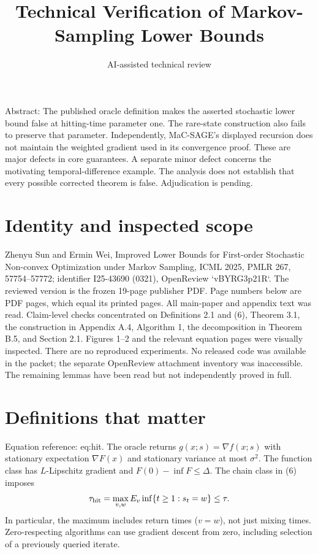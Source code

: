 \documentclass[10pt]{article}
\title{Technical Verification of Markov-Sampling Lower Bounds}
\author{AI-assisted technical review}
\date{}
\begin{document}
\maketitle
Abstract: The published oracle definition makes the asserted stochastic lower bound false at hitting-time parameter one. The rare-state construction also fails to preserve that parameter. Independently, MaC-SAGE’s displayed recursion does not maintain the weighted gradient used in its convergence proof. These are major defects in core guarantees. A separate minor defect concerns the motivating temporal-difference example. The analysis does not establish that every possible corrected theorem is false. Adjudication is pending.\par
\section*{Identity and inspected scope}
Zhenyu Sun and Ermin Wei, Improved Lower Bounds for First-order Stochastic Non-convex Optimization under Markov Sampling, ICML 2025, PMLR 267, 57754–57772; identifier I25-43690 (0321), OpenReview `vBYRG3p21R`. The reviewed version is the frozen 19-page publisher PDF. Page numbers below are PDF pages, which equal its printed pages. All main-paper and appendix text was read. Claim-level checks concentrated on Definitions 2.1 and (6), Theorem 3.1, the construction in Appendix A.4, Algorithm 1, the decomposition in Theorem B.5, and Section 2.1. Figures 1–2 and the relevant equation pages were visually inspected. There are no reproduced experiments. No released code was available in the packet; the separate OpenReview attachment inventory was inaccessible. The remaining lemmas have been read but not independently proved in full.\par
\section*{Definitions that matter}
Equation reference: eq:hit. The oracle returns \(g(x;s)=\nabla f(x;s)\) with stationary expectation \(\nabla F(x)\) and stationary variance at most \(\sigma^2\). The function class has \(L\)-Lipschitz gradient and \(F(0)-\inf F\leq\Delta\). The chain class in (6) imposes \[
 \tau_{\rm hit}=\max_{v,w}E_v\inf\{t\geq1:s_t=w\}\leq\tau.\] In particular, the maximum includes return times (\(v=w\)), not just mixing times. Zero-respecting algorithms can use gradient descent from zero, including selection of a previously queried iterate.\par
\end{document}
